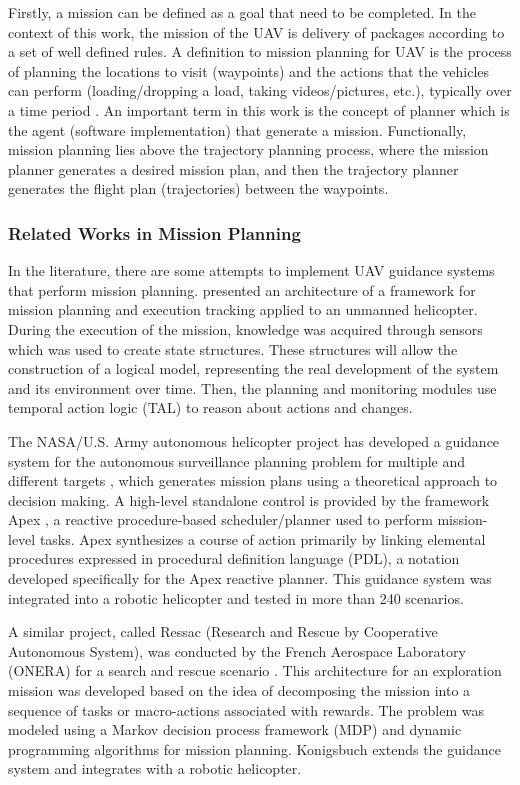 \documentclass[conference,harvard,brazil,english]{sbatex}
\begin{document}
Firstly, a mission can be defined as a goal that need to be completed. In the context of this work, the mission of the UAV is delivery of packages according to a set of well defined rules. A definition to mission planning for UAV is the process of planning the locations to visit (waypoints) and the actions that the vehicles can perform (loading/dropping a load, taking videos/pictures, etc.), typically over a time period \cite{ramirez2014solving}. An important term in this work is the concept of planner which is the agent (software implementation) that generate a mission. Functionally, mission planning lies above the trajectory planning process, where the mission planner generates a desired mission plan, and then the trajectory planner generates the flight plan (trajectories) between the waypoints.

\subsubsection{Related Works in Mission Planning}

In the literature, there are some attempts to implement UAV guidance systems that perform mission planning.  presented an architecture of a framework for mission planning and execution tracking applied to an unmanned helicopter. During the execution of the mission, knowledge was acquired through sensors which was used to create state structures. These structures will allow the construction of a logical model, representing the real development of the system and its environment over time. Then, the planning and monitoring modules use temporal action logic (TAL) to reason about actions and changes.

The NASA/U.S. Army autonomous helicopter project has developed a guidance system for the autonomous surveillance planning problem for multiple and different targets \cite{whalley2005design}, which generates mission plans using a theoretical approach to decision making. A high-level standalone control is provided by the framework Apex \cite{baer1998nasa}, a reactive procedure-based scheduler/planner used to perform mission-level tasks. Apex synthesizes a course of action primarily by linking elemental procedures expressed in procedural definition language (PDL), a notation developed specifically for the Apex reactive planner. This guidance system was integrated into a robotic helicopter and tested in more than 240 scenarios.

A similar project, called Ressac (Research and Rescue by Cooperative Autonomous System), was conducted by the French Aerospace Laboratory (ONERA) for a search and rescue scenario \cite{fabiani2007autonomous}. This architecture for an exploration mission was developed based on the idea of decomposing the mission into a sequence of tasks or macro-actions associated with rewards. The problem was modeled using a Markov decision process framework (MDP) and dynamic programming algorithms for mission planning. Konigsbuch \cite{teichteil2007multi} extends the guidance system and integrates with a robotic helicopter.
\end{document}

